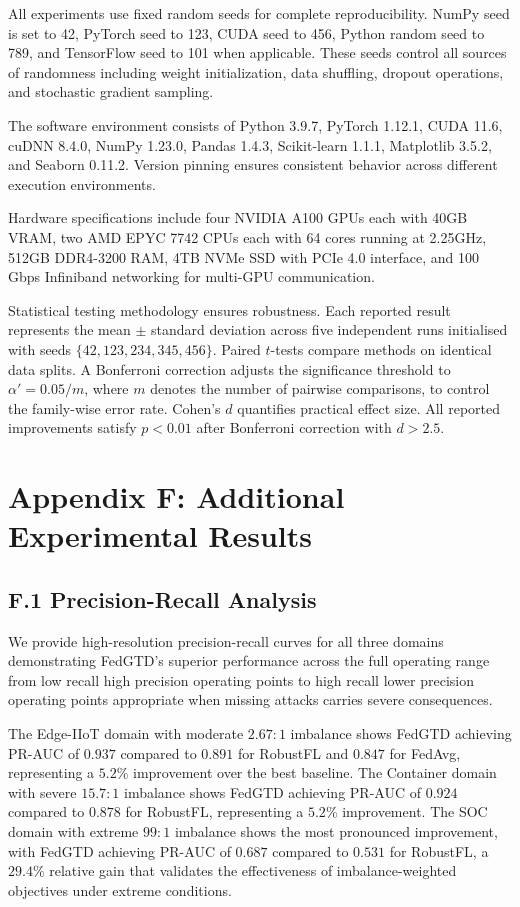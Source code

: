 \documentclass[12pt,a4paper]{article}
\theoremstyle{definition}
\begin{document}
All experiments use fixed random seeds for complete reproducibility. NumPy seed is set to 42, PyTorch seed to 123, CUDA seed to 456, Python random seed to 789, and TensorFlow seed to 101 when applicable. These seeds control all sources of randomness including weight initialization, data shuffling, dropout operations, and stochastic gradient sampling.

The software environment consists of Python 3.9.7, PyTorch 1.12.1, CUDA 11.6, cuDNN 8.4.0, NumPy 1.23.0, Pandas 1.4.3, Scikit-learn 1.1.1, Matplotlib 3.5.2, and Seaborn 0.11.2. Version pinning ensures consistent behavior across different execution environments.

Hardware specifications include four NVIDIA A100 GPUs each with 40GB VRAM, two AMD EPYC 7742 CPUs each with 64 cores running at 2.25GHz, 512GB DDR4-3200 RAM, 4TB NVMe SSD with PCIe 4.0 interface, and 100 Gbps Infiniband networking for multi-GPU communication.

Statistical testing methodology ensures robustness. Each reported result represents the mean $\pm$ standard deviation across five independent runs initialised with seeds $\{42, 123, 234, 345, 456\}$. Paired $t$-tests compare methods on identical data splits. A Bonferroni correction adjusts the significance threshold to $\alpha' = 0.05 / m$, where $m$ denotes the number of pairwise comparisons, to control the family-wise error rate. Cohen's $d$ quantifies practical effect size. All reported improvements satisfy $p < 0.01$ after Bonferroni correction with $d > 2.5$.

\section{Appendix F: Additional Experimental Results}

\subsection{F.1 Precision-Recall Analysis}

We provide high-resolution precision-recall curves for all three domains demonstrating FedGTD's superior performance across the full operating range from low recall high precision operating points to high recall lower precision operating points appropriate when missing attacks carries severe consequences.

The Edge-IIoT domain with moderate $2.67{:}1$ imbalance shows FedGTD achieving PR-AUC of $0.937$ compared to $0.891$ for RobustFL and $0.847$ for FedAvg, representing a $5.2\%$ improvement over the best baseline. The Container domain with severe $15.7{:}1$ imbalance shows FedGTD achieving PR-AUC of $0.924$ compared to $0.878$ for RobustFL, representing a $5.2\%$ improvement. The SOC domain with extreme $99{:}1$ imbalance shows the most pronounced improvement, with FedGTD achieving PR-AUC of $0.687$ compared to $0.531$ for RobustFL, a $29.4\%$ relative gain that validates the effectiveness of imbalance-weighted objectives under extreme conditions.
\end{document}
